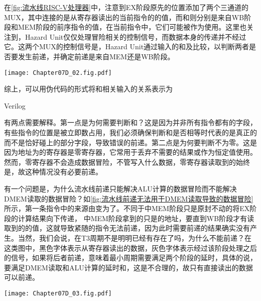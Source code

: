 在\cref{fig:流水线RISC-V处理器}中，注意到EX阶段原先的位置添加了两个三通道的MUX，其中连接的是从寄存器读出的当前指令的的值，而和则分别是来自WB阶段和MEM阶段的前序指令的值，在当前指令中，它们可能被作为使用。这里也关注到，Hazard Unit仅仅处理冒险相关的控制信号，而数据本身的传递并不经过它。这两个MUX的控制信号是，Hazard Unit通过输入的和及比较，以判断两者是否要发生前递，并确定前递是来自MEM还是WB阶段。

\begin{Figure}[流水线前递]
    \texttt{[image: Chapter07D\_02.fig.pdf]}
\end{Figure}

综上，可以用伪代码的形式将和相关输入的关系表示为
\begin{Code}[流水线前递的伪代码表示]{Verilog}
    
\end{Code}

有两点需要解释。第一点是为何需要判断和？这是因为并非所有指令都有的字段，有些指令的位置是被立即数占用，我们必须确保判断和是否相等时代表的是真正的而不是恰好碰上的部分字段，导致错误的前递。第二点是为何要判断不为零。这是因为地址为的寄存器是零寄存器，它常用于丢弃不需要的结果或作为恒定值使用。然而，零寄存器不会造成数据冒险，不管写入什么数据，零寄存器读取到的始终是，故这种情况没有必要前递。

有一个问题是，为什么流水线前递只能解决ALU计算的数据冒险而不能解决DMEM读取的数据冒险？如\cref{fig:流水线前递无法用于DMEM读取导致的数据冒险}所示，第一条指令中的来源由变为了。不同于中MEM阶段只是原封不动的将EX阶段的计算结果向下传递， 中MEM阶段拿到的只是的地址，要直到WB阶段才有读取到的的值，这就导致紧随的指令无法前递，因为此时需要前递的结果确实没有产生。当然，我们会说，在T3周期不是明明已经有存在了吗，为什么不能前递？在这类图中，黑色字体表示从寄存器读出的数据，灰色字体表示经过该阶段处理之后的信号，如果将后者前递，意味着最小周期需要满足两个阶段的延时，具体的说，要满足DMEM读取和ALU计算的延时和，这是不合理的，故只有直接读出的数据可以前递。
 
\begin{Figure}[流水线前递无法用于DMEM读取导致的数据冒险]
    \texttt{[image: Chapter07D\_03.fig.pdf]}
\end{Figure}

